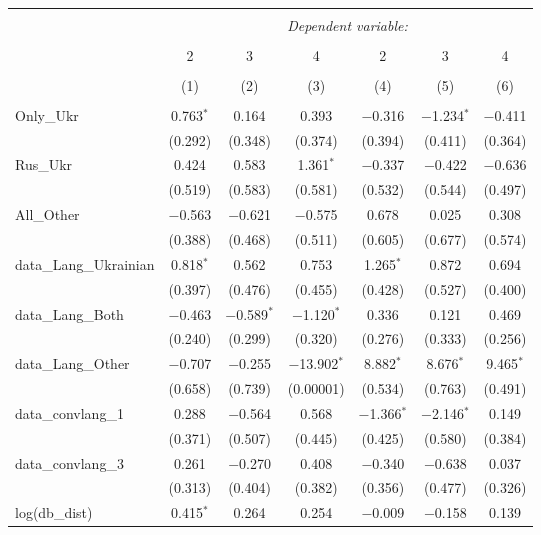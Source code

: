 
\begin{table}[!htbp] \centering 
  \caption{} 
  \label{} 
\tiny 
\begin{tabular}{@{\extracolsep{1pt}}lcccccc} 
\\[-1.8ex]\hline 
\hline \\[-1.8ex] 
 & \multicolumn{6}{c}{\textit{Dependent variable:}} \\ 
\cline{2-7} 
\\[-1.8ex] & 2 & 3 & 4 & 2 & 3 & 4 \\ 
\\[-1.8ex] & (1) & (2) & (3) & (4) & (5) & (6)\\ 
\hline \\[-1.8ex] 
 Only\_Ukr & 0.763$^{*}$ & 0.164 & 0.393 & $-$0.316 & $-$1.234$^{*}$ & $-$0.411 \\ 
  & (0.292) & (0.348) & (0.374) & (0.394) & (0.411) & (0.364) \\ 
  Rus\_Ukr & 0.424 & 0.583 & 1.361$^{*}$ & $-$0.337 & $-$0.422 & $-$0.636 \\ 
  & (0.519) & (0.583) & (0.581) & (0.532) & (0.544) & (0.497) \\ 
  All\_Other & $-$0.563 & $-$0.621 & $-$0.575 & 0.678 & 0.025 & 0.308 \\ 
  & (0.388) & (0.468) & (0.511) & (0.605) & (0.677) & (0.574) \\ 
  data\_Lang\_Ukrainian & 0.818$^{*}$ & 0.562 & 0.753 & 1.265$^{*}$ & 0.872 & 0.694 \\ 
  & (0.397) & (0.476) & (0.455) & (0.428) & (0.527) & (0.400) \\ 
  data\_Lang\_Both & $-$0.463 & $-$0.589$^{*}$ & $-$1.120$^{*}$ & 0.336 & 0.121 & 0.469 \\ 
  & (0.240) & (0.299) & (0.320) & (0.276) & (0.333) & (0.256) \\ 
  data\_Lang\_Other & $-$0.707 & $-$0.255 & $-$13.902$^{*}$ & 8.882$^{*}$ & 8.676$^{*}$ & 9.465$^{*}$ \\ 
  & (0.658) & (0.739) & (0.00001) & (0.534) & (0.763) & (0.491) \\ 
  data\_convlang\_1 & 0.288 & $-$0.564 & 0.568 & $-$1.366$^{*}$ & $-$2.146$^{*}$ & 0.149 \\ 
  & (0.371) & (0.507) & (0.445) & (0.425) & (0.580) & (0.384) \\ 
  data\_convlang\_3 & 0.261 & $-$0.270 & 0.408 & $-$0.340 & $-$0.638 & 0.037 \\ 
  & (0.313) & (0.404) & (0.382) & (0.356) & (0.477) & (0.326) \\ 
  log(db\_dist) & 0.415$^{*}$ & 0.264 & 0.254 & $-$0.009 & $-$0.158 & 0.139 \\ 

\end{tabular}
\end{table}
